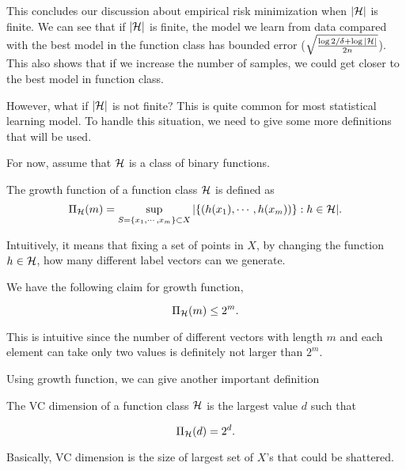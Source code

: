 \documentclass[../main.tex]{subfiles}
\begin{document}
	This concludes our discussion about empirical risk minimization when $|\mathcal{H}|$ is finite. We can see that if $|\mathcal{H}|$ is finite, the model we learn from data compared with the best model in the function class has bounded error ($\sqrt{\frac{\log 2 / \delta + \log |\mathcal{H}|}{2n}}$). This also shows that if we increase the number of samples, we could get closer to the best model in function class. 
	
	However, what if $|\mathcal{H}|$ is not finite? This is quite common for most statistical learning model. To handle this situation, we need to give some more definitions that will be used. 
	
	For now, assume that $\mathcal{H}$ is a class of binary functions.
	
	\begin{definition}
		The growth function of a function class $\mathcal{H}$ is defined as
		\begin{equation*}
			\Pi_{\mathcal{H}}(m) = \sup\limits_{S= \{x_1, \cdots, x_m\} \subset X} |\{(h(x_1), \cdots, h(x_m))\} : h\in \mathcal{H}|.
		\end{equation*}
	\end{definition}

	Intuitively, it means that fixing a set of points in $X$, by changing the function $h\in \mathcal{H}$, how many different label vectors can we generate.
	
	We have the following claim for growth function,
	
	\begin{claim}
			\begin{equation*}
				\Pi_{\mathcal{H}}(m) \leq 2^m.
			\end{equation*}
	\end{claim} 
	
	This is intuitive since the number of different vectors with length $m$ and each element can take only two values is definitely not larger than $2^m$.
	
	Using growth function, we can give another important definition
	
	\begin{definition}
		The VC dimension of a function class $\mathcal{H}$ is the largest value $d$ such that
		
		\begin{equation}
			\Pi_{\mathcal{H}}(d) = 2^d.
		\end{equation}
		
		Basically, VC dimension is the size of largest set of $X$'s that could be shattered.
	\end{definition}
\end{document}

